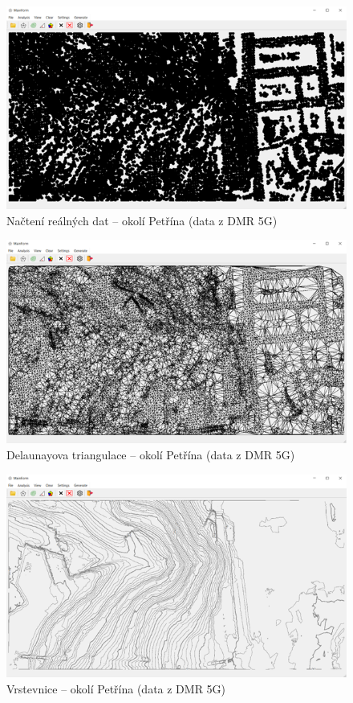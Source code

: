 \begin{figure}[H]
    \centering
    \includegraphics[width=\textwidth]{images/Ukazka_petrin_body.png}
    \caption{Načtení reálných dat – okolí Petřína (data z DMR 5G)}
\end{figure}

\begin{figure}[H]
    \centering
    \includegraphics[width=\textwidth]{images/Ukazka_petrin_DT.png}
    \caption{Delaunayova triangulace – okolí Petřína (data z DMR 5G)}
\end{figure}

\begin{figure}[H]
    \centering
    \includegraphics[width=\textwidth]{images/Ukazka_petrin_contourlines.png}
    \caption{Vrstevnice – okolí Petřína (data z DMR 5G)}
\end{figure}

